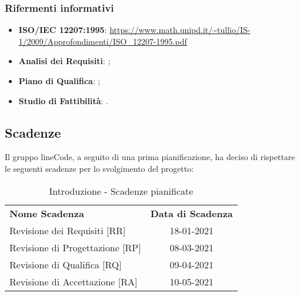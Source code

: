 	\subsubsection{Rifermenti informativi}
	\begin{itemize}
		\item \textbf{ISO/IEC 12207:1995}: \url{https://www.math.unipd.it/~tullio/IS-1/2009/Approfondimenti/ISO_12207-1995.pdf}
		\item \textbf{Analisi dei Requisiti}: ;
		\item \textbf{Piano di Qualifica}: ;
		\item \textbf{Studio di Fattibilità}: .
	\end{itemize}

\subsection{Scadenze}
	Il gruppo lineCode, a seguito di una prima pianificazione, ha deciso di rispettare le seguenti scadenze per lo svolgimento del progetto:
	\begin{table} [h!]
		\begin{center}
			\begin{tabular} { m{5.5cm} c }
				\rowcolor{lightgray}
				\textbf{Nome Scadenza} & \textbf{Data di Scadenza} \\ 
				Revisione dei Requisiti [RR] & 18-01-2021 \\ 
				Revisione di Progettazione [RP] & 08-03-2021 \\ 
				Revisione di Qualifica [RQ] & 09-04-2021 \\ 
				Revisione di Accettazione [RA] & 10-05-2021 \\
			\end{tabular}
			\caption{Introduzione - Scadenze pianificate}
		\end{center}
	\end{table}